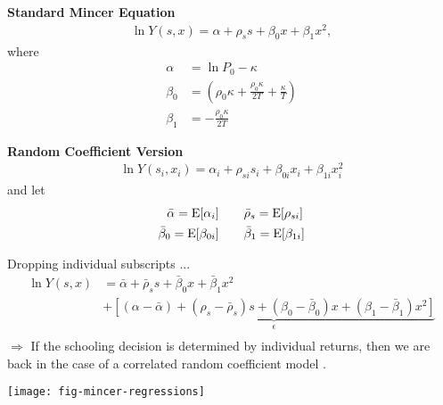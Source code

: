 \begin{frame}
\textbf{Standard Mincer Equation}
\begin{align*}
\ln Y(s, x) = \alpha + \rho_s s + \beta_0 x + \beta_1 x^2,
\end{align*}
where
\begin{align*}
\alpha & =\ln{P_0} - \kappa \\
\beta_0 & = \left(\rho_0\kappa + \frac{\rho_0\kappa}{2T} + \frac{\kappa}{T}\right) \\
\beta_1 & = -\frac{\rho_0\kappa}{2T}
\end{align*}
\end{frame}

\begin{frame}
\textbf{Random Coefficient Version}
\begin{align*}
\ln{Y(s_i, x_i)} = \alpha_{i} + \rho_{si} s_i + \beta_{0i} x_i + \beta_{1i} x_i^2
\end{align*}
and let
\begin{align*}
\bar{\alpha} = \mathrm{E}[\alpha_i] &\qquad \bar{\rho}_s = \mathrm{E}[\rho_{si}]\\
\bar{\beta}_0 = \mathrm{E}[\beta_{0i}]&\qquad \bar{\beta}_1 = \mathrm{E}[\beta_{1i}]
\end{align*}
\end{frame}


\begin{frame}
Dropping individual subscripts ...
\begin{align*}
\ln{Y(s, x)} & = \bar{\alpha} + \bar{\rho}_s s + \bar{\beta}_{0} x + \bar{\beta}_{1} x^2 \\
                & + \underbrace{[(\alpha - \bar{\alpha}) + (\rho_s - \bar{\rho}_s) s + (\beta_0 - \bar{\beta}_0)x + (\beta_1 - \bar{\beta}_1)x^2 ]}_{\epsilon}\\
\end{align*}
$\Rightarrow$ If the schooling decision is determined by individual returns, then we are back in the case of a correlated random coefficient model \cite{Heckman.2006d}.
\end{frame}





\begin{frame}[plain]

\begin{center}
\texttt{[image: fig-mincer-regressions]}
\end{center}

\end{frame}

